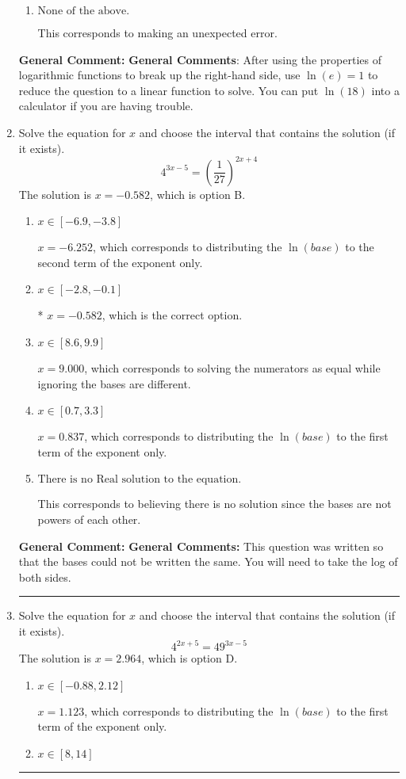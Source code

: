\documentclass{extbook}[14pt]
\newcommand{\litem}[1]{\item #1

\rule{\textwidth}{0.4pt}}
\begin{document}
\begin{enumerate}
{\begin{enumerate}[label=\Alph*.]
This corresponds to believing you cannot solve the equation.
\item \( \text{None of the above.} \)

This corresponds to making an unexpected error.
\end{enumerate}

\textbf{General Comment:} \textbf{General Comments}: After using the properties of logarithmic functions to break up the right-hand side, use $\ln(e) = 1$ to reduce the question to a linear function to solve. You can put $\ln(18)$ into a calculator if you are having trouble.
}
\litem{
Solve the equation for $x$ and choose the interval that contains the solution (if it exists).
\[ 4^{3x-5} = \left(\frac{1}{27}\right)^{2x+4} \]The solution is \( x = -0.582 \), which is option B.\begin{enumerate}[label=\Alph*.]
\item \( x \in [-6.9, -3.8] \)

$x = -6.252$, which corresponds to distributing the $\ln(base)$ to the second term of the exponent only.
\item \( x \in [-2.8, -0.1] \)

* $x = -0.582$, which is the correct option.
\item \( x \in [8.6, 9.9] \)

$x = 9.000$, which corresponds to solving the numerators as equal while ignoring the bases are different.
\item \( x \in [0.7, 3.3] \)

$x = 0.837$, which corresponds to distributing the $\ln(base)$ to the first term of the exponent only.
\item \( \text{There is no Real solution to the equation.} \)

This corresponds to believing there is no solution since the bases are not powers of each other.
\end{enumerate}

\textbf{General Comment:} \textbf{General Comments:} This question was written so that the bases could not be written the same. You will need to take the log of both sides.
}
\litem{
Solve the equation for $x$ and choose the interval that contains the solution (if it exists).
\[ 4^{2x+5} = 49^{3x-5} \]The solution is \( x = 2.964 \), which is option D.\begin{enumerate}[label=\Alph*.]
\item \( x \in [-0.88, 2.12] \)

$x = 1.123$, which corresponds to distributing the $\ln(base)$ to the first term of the exponent only.
\item \( x \in [8, 14] \)


\end{enumerate}}
\end{enumerate}
\end{document}
